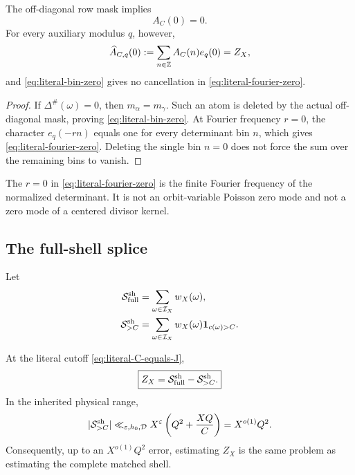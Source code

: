 \begin{proposition}
\label{prop:two-zeros}
The off-diagonal row mask implies
\begin{equation}
 A_C(0)=0.
 \label{eq:literal-bin-zero}
\end{equation}
For every auxiliary modulus \(q\), however,
\begin{equation}
 \widehat A_{C,q}(0)
 :=\sum_{n\in\mathbb Z}A_C(n)e_q(0)
 =Z_X,
 \label{eq:literal-fourier-zero}
\end{equation}
and \eqref{eq:literal-bin-zero} gives no cancellation in
\eqref{eq:literal-fourier-zero}.
\end{proposition}

\begin{proof}
If \(\Delta^\#(\omega)=0\), then
\(m_\alpha=m_\gamma\).  Such an atom is deleted by the actual
off-diagonal mask, proving \eqref{eq:literal-bin-zero}.  At Fourier
frequency \(r=0\), the character
\(e_q(-r n)\) equals one for every determinant bin \(n\), which gives
\eqref{eq:literal-fourier-zero}.  Deleting the single bin \(n=0\)
does not force the sum over the remaining bins to vanish.
\end{proof}

\begin{remark}
The \(r=0\) in \eqref{eq:literal-fourier-zero} is the finite Fourier
frequency of the normalized determinant.  It is not an orbit-variable
Poisson zero mode and not a zero mode of a centered divisor kernel.
\end{remark}

\subsection{The full-shell splice}

Let
\begin{align}
 \mathcal S_{\rm full}^{\rm sh}
 &=\sum_{\omega\in\mathcal I_X}w_X(\omega),\\
 \mathcal S_{>C}^{\rm sh}
 &=\sum_{\omega\in\mathcal I_X}
   w_X(\omega)\mathbf 1_{c(\omega)>C}.
 \label{eq:literal-large-content-shell}
\end{align}

\begin{proposition}
\label{prop:zero-full-shell}
At the literal cutoff \eqref{eq:literal-C-equals-J},
\begin{equation}
 \boxed{
 Z_X
 =\mathcal S_{\rm full}^{\rm sh}-\mathcal S_{>C}^{\rm sh}.}
 \label{eq:literal-zero-full-shell}
\end{equation}
In the inherited physical range,
\begin{equation}
 |\mathcal S_{>C}^{\rm sh}|
 \ll_{\varepsilon,h_0,\mathcal D}
 X^\varepsilon
 \left(Q^2+\frac{XQ}{C}\right)
 =X^{o(1)}Q^2.
 \label{eq:literal-large-content-bound}
\end{equation}
Consequently, up to an \(X^{o(1)}Q^2\) error, estimating \(Z_X\) is
the same problem as estimating the complete matched shell.
\end{proposition}

